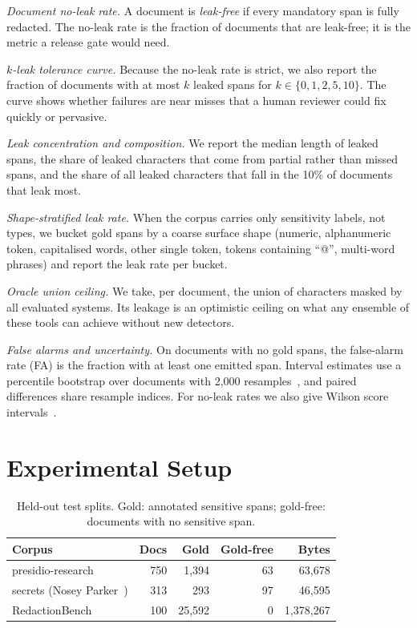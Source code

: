 \documentclass[conference]{IEEEtran}
\begin{document}
\textit{Document no-leak rate.} A document is \emph{leak-free} if every
mandatory span is fully redacted. The no-leak rate is the fraction of
documents that are leak-free; it is the metric a release gate would need.

\textit{$k$-leak tolerance curve.} Because the no-leak rate is strict, we also
report the fraction of documents with at most $k$ leaked spans for
$k\in\{0,1,2,5,10\}$. The curve shows whether failures are near misses that a
human reviewer could fix quickly or pervasive.

\textit{Leak concentration and composition.} We report the median length of
leaked spans, the share of leaked characters that come from partial rather
than missed spans, and the share of all leaked characters that fall in the
10\% of documents that leak most.

\textit{Shape-stratified leak rate.} When the corpus carries only sensitivity
labels, not types, we bucket gold spans by a coarse surface shape (numeric,
alphanumeric token, capitalised words, other single token, tokens containing
``@'', multi-word phrases) and report the leak rate per bucket.

\textit{Oracle union ceiling.} We take, per document, the union of characters
masked by all evaluated systems. Its leakage is an optimistic ceiling on what
any ensemble of these tools can achieve without new detectors.

\textit{False alarms and uncertainty.} On documents with no gold spans, the
false-alarm rate (FA) is the fraction with at least one emitted span.
Interval estimates use a percentile bootstrap over documents with 2{,}000
resamples~\cite{efron1994bootstrap}, and paired differences share resample
indices. For no-leak rates we also give Wilson score
intervals~\cite{wilson1927}.

\section{Experimental Setup}

\begin{table}[t]
\centering
\caption{Held-out test splits. Gold: annotated sensitive spans; gold-free:
documents with no sensitive span.}
\label{tab:corpora}
\setlength{\tabcolsep}{4pt}
\begin{tabular}{lrrrr}
\toprule
Corpus & Docs & Gold & Gold-free & Bytes \\
\midrule
presidio-research~\cite{presidioresearch} & 750 & 1{,}394 & 63 & 63{,}678 \\
secrets (Nosey Parker~\cite{noseyparker}) & 313 & 293 & 97 & 46{,}595 \\
RedactionBench~\cite{redactionbench} & 100 & 25{,}592 & 0 & 1{,}378{,}267 \\
\bottomrule
\end{tabular}
\end{table}
\end{document}
